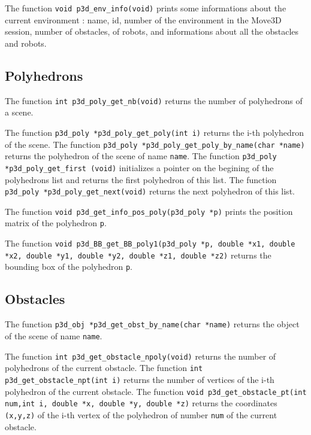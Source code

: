 The function {\tt void p3d\_env\_info(void)}  prints some informations
about the current environment : name, id, number of the environment in
the Move3D session, number of obstacles, of robots, and informations
about all the obstacles and robots.

\subsection{Polyhedrons}

The function {\tt int p3d\_poly\_get\_nb(void)}
 returns the number of polyhedrons of a
scene. 

The function {\tt p3d\_poly *p3d\_poly\_get\_poly(int i)}
 returns the i-th polyhedron of the
scene. The function {\tt p3d\_poly
*p3d\_poly\_get\_poly\_by\_name(char *name)}
 returns the polyhedron of
the scene of name {\tt name}. The function {\tt p3d\_poly
*p3d\_poly\_get\_first (void)} 
initializes a pointer on the begining of the polyhedrons list and
returns the first polyhedron of this list. The function {\tt p3d\_poly
*p3d\_poly\_get\_next(void)}  returns
the next polyhedron of this list.

The function {\tt void p3d\_get\_info\_pos\_poly(p3d\_poly *p)}
 prints
the position matrix of the polyhedron {\tt p}.

The function {\tt void p3d\_BB\_get\_BB\_poly1(p3d\_poly *p, double
*x1, double *x2, double *y1, double *y2, double *z1, double *z2)}
 returns
the bounding box of the polyhedron {\tt p}.

\subsection{Obstacles}

The function {\tt p3d\_obj *p3d\_get\_obst\_by\_name(char *name)}
 returns the object of the scene of
name {\tt name}.

The function {\tt int p3d\_get\_obstacle\_npoly(void)}
 returns the
number of polyhedrons of the current obstacle. The function {\tt int
p3d\_get\_obstacle\_npt(int i)} 
returns the number of vertices of the i-th polyhedron of the current
obstacle. The function {\tt void p3d\_get\_obstacle\_pt(int num,int i,
double *x, double *y, double *z)} 
returns the coordinates {\tt (x,y,z)} of the i-th vertex of the
polyhedron of number {\tt num} of the current obstacle. 

